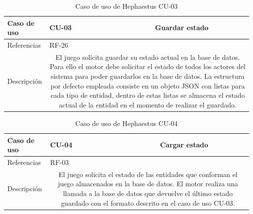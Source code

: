 \begin{table}[H]
	\centering
	\small
	\begin{tabularx}{\linewidth}{|l|cc|}
		\hline
		{\cellcolor[HTML]{C0C0C0} Caso de uso} & \multicolumn{1}{l|}{CU-03} & Guardar estado \\ \hline
		{\cellcolor[HTML]{C0C0C0} Referencias} & \multicolumn{2}{l|}{RF-26} \\ \hline
		{\cellcolor[HTML]{C0C0C0} Descripción} & \multicolumn{2}{X|}{El juego solicita guardar su estado actual en la base de datos. Para ello el motor debe solicitar el estado de todos los actores del sistema para poder guardarlos en la base de datos. La estructura por defecto empleada consiste en un objeto JSON con listas para cada tipo de entidad, dentro de estas listas se almacena el estado actual de la entidad en el momento de realizar el guardado.} \\ \hline
	\end{tabularx}
	
	\vspace{0.5cm}
	\caption{Caso de uso de Hephaestus CU-03}
	\label{tab:hephaestus-cu-03}
\end{table}

\begin{table}[H]
	\centering
	\small
	\begin{tabularx}{\linewidth}{|l|cc|}
		\hline
		{\cellcolor[HTML]{C0C0C0} Caso de uso} & \multicolumn{1}{l|}{CU-04} & Cargar estado \\ \hline
		{\cellcolor[HTML]{C0C0C0} Referencias} & \multicolumn{2}{l|}{RF-03} \\ \hline
		{\cellcolor[HTML]{C0C0C0} Descripción} & \multicolumn{2}{X|}{El juego solicita el estado de las entidades que conforman el juego almacenados en la base de datos. El motor realiza una llamada a la base de datos que devuelve el último estado guardado con el formato descrito en el caso de uso CU-03.} \\ \hline
	\end{tabularx}
	
	\vspace{0.5cm}
	\caption{Caso de uso de Hephaestus CU-04}
	\label{tab:hephaestus-cu-04}
\end{table}

